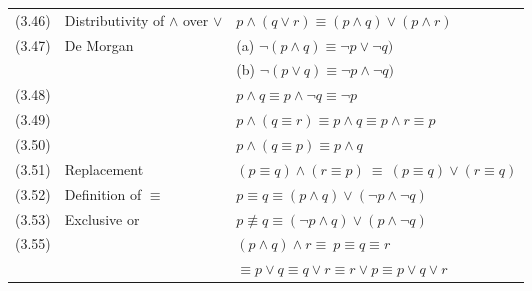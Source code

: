 \documentclass[letterpaper, 8pt]{extarticle}
\begin{document}
\begin{multicols*}{3}
\begin{tabular}{@{}lll@{}}
        (3.46) & Distributivity of $\land$ over $\lor$  & $p \land (q \lor r) \equiv (p \land q) \lor (p \land r)$                       \\
        (3.47) & De Morgan                              & (a) $\neg (p \land q) \equiv \neg p \lor \neg q)$                              \\
               &                                        & (b) $\neg (p \lor q) \equiv \neg p \land \neg q)$                              \\
        (3.48) &                                        & $p \land q \equiv p \land \neg q \equiv \neg p$                                \\
        (3.49) &                                        & $p \land (q \equiv r) \equiv p \land q \equiv p \land r \equiv p$              \\
        (3.50) &                                        & $p \land (q \equiv p) \equiv p \land q$                                        \\
        (3.51) & Replacement                            & $(p \equiv q) \land (r \equiv p) \ \equiv \ (p \equiv q) \lor (r \equiv q)$    \\
        (3.52) & Definition of $\equiv$                 & $p \equiv q \equiv (p \land q) \lor (\neg p \land \neg q)$                     \\
        (3.53) & Exclusive or                           & $p \not\equiv q \equiv (\neg p \land q) \lor (p \land \neg q)$                 \\
        (3.55) &                                        & $(p \land q) \land r \equiv \ p \equiv q \equiv r$                             \\
               &                                        & \quad $\equiv p \lor q \equiv q \lor r \equiv r \lor p \equiv p \lor q \lor r$ \\
    \end{tabular}


\end{multicols*}
\end{document}
